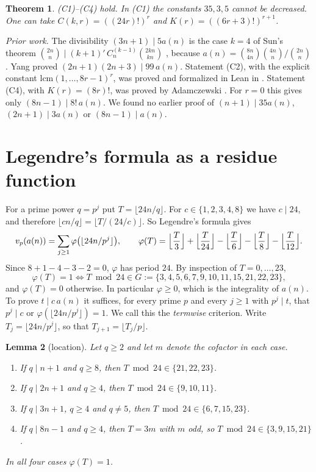 \documentclass[11pt]{amsart}
\newtheorem{theorem}{Theorem}
\newtheorem{lemma}[theorem]{Lemma}
\theoremstyle{remark}
\begin{document}
\begin{theorem}\label{thm:main}
(C1)--(C4) hold.
In (C1) the constants $35,3,5$ cannot be decreased.
One can take $C(k,r)=((24r)!)^r$ and $K(r)=((6r+3)!)^{r+1}$.
\end{theorem}

\emph{Prior work.}
The divisibility $(3n+1)\mid5a(n)$ is the case $k=4$ of Sun's theorem $\binom{2n}{n}\mid(k+1)'\,C^{(k-1)}_n\binom{2kn}{kn}$ \cite{Sun}, because $a(n)=\binom{8n}{4n}\binom{4n}{n}/\binom{2n}{n}$.
Yang \cite{Yang} proved $(2n+1)(2n+3)\mid99\,a(n)$.
Statement (C2), with the explicit constant $\mathrm{lcm}(1,\dots,8r-1)^r$, was proved and formalized in Lean in \cite{Danny}.
Statement (C4), with $K(r)=(8r)!$, was proved by Adamczewski \cite[Appendix~A]{Adam}.
For $r=0$ this gives only $(8n-1)\mid8!\,a(n)$.
We found no earlier proof of $(n+1)\mid35a(n)$, $(2n+1)\mid3a(n)$ or $(8n-1)\mid a(n)$.

\section{Legendre's formula as a residue function}

For a prime power $q=p^j$ put $T=\lfloor24n/q\rfloor$.
For $c\in\{1,2,3,4,8\}$ we have $c\mid24$, and therefore $\lfloor cn/q\rfloor=\lfloor T/(24/c)\rfloor$.
So Legendre's formula gives
\begin{equation}\label{eq:vp}
v_p(a(n))=\sum_{j\ge1}\varphi\bigl(\lfloor24n/p^j\rfloor\bigr),\qquad \varphi(T)=\Bigl\lfloor\frac T3\Bigr\rfloor+\Bigl\lfloor\frac T{24}\Bigr\rfloor-\Bigl\lfloor\frac T6\Bigr\rfloor-\Bigl\lfloor\frac T8\Bigr\rfloor-\Bigl\lfloor\frac T{12}\Bigr\rfloor .
\end{equation}
Since $8+1-4-3-2=0$, $\varphi$ has period $24$.
By inspection of $T=0,\dots,23$,
\begin{equation}\label{eq:G}
\varphi(T)=1\iff T\bmod24\in G:=\{3,4,5,6,7,9,10,11,15,21,22,23\},
\end{equation}
and $\varphi(T)=0$ otherwise.
In particular $\varphi\ge0$, which is the integrality of $a(n)$.
To prove $t\mid c\,a(n)$ it suffices, for every prime $p$ and every $j\ge1$ with $p^j\mid t$, that $p^j\mid c$ or $\varphi(\lfloor24n/p^j\rfloor)=1$.
We call this the \emph{termwise} criterion.
Write $T_j=\lfloor24n/p^j\rfloor$, so that $T_{j+1}=\lfloor T_j/p\rfloor$.

\begin{lemma}[location]\label{lem:loc}
Let $q\ge2$ and let $m$ denote the cofactor in each case.
\begin{enumerate}
\item[(L1)] If $q\mid n+1$ and $q\ge8$, then $T\bmod24\in\{21,22,23\}$.
\item[(L2)] If $q\mid2n+1$ and $q\ge4$, then $T\bmod24\in\{9,10,11\}$.
\item[(L3)] If $q\mid3n+1$, $q\ge4$ and $q\ne5$, then $T\bmod 24\in\{6,7,15,23\}$.
\item[(L4)] If $q\mid8n-1$ and $q\ge4$, then $T=3m$ with $m$ odd, so $T\bmod24\in\{3,9,15,21\}$.
\end{enumerate}
In all four cases $\varphi(T)=1$.
\end{lemma}
\end{document}

